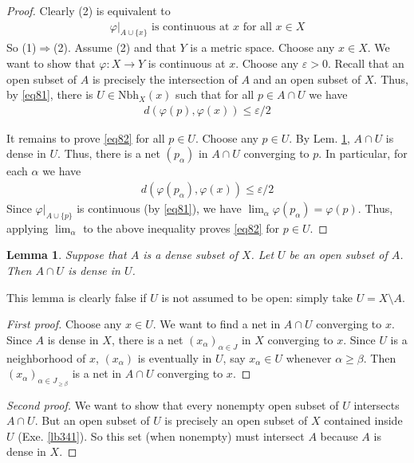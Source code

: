 \documentclass[12pt,b5paper,notitlepage]{article}
\theoremstyle{definition}
\theoremstyle{plain}
\newtheorem{lm}[df]{Lemma}
\newcommand{\Nbh}{\mathrm{Nbh}}
\newcommand{\eps}{\varepsilon}
\numberwithin{equation}{section}
\begin{document}
\begin{proof}
Clearly (2) is equivalent to
\begin{align}\label{eq81}
\varphi|_{A\cup\{x\}}\text{ is continuous at $x$ for all $x\in X$}
\end{align}
So (1)$\Rightarrow$(2). Assume (2) and that $Y$ is a metric space. Choose any $x\in X$. We want to show that $\varphi:X\rightarrow Y$ is continuous at $x$. Choose any $\eps>0$. Recall that an open subset of $A$ is precisely the intersection of $A$ and an open subset of $X$. Thus, by \eqref{eq81}, there is $U\in\Nbh_X(x)$ such that for all $p\in A\cap U$ we have
\begin{align}
d(\varphi(p),\varphi(x))\leq \eps/2\label{eq82}
\end{align}


It remains to prove \eqref{eq82} for all $p\in U$. Choose any $p\in U$. By Lem. \ref{lb342}, $A\cap U$ is dense in $U$.  Thus, there is a net $(p_\alpha)$ in $A\cap U$ converging to $p$. In particular, for each $\alpha$ we have
\begin{align*}
d(\varphi(p_\alpha),\varphi(x))\leq \eps/2
\end{align*}
Since $\varphi|_{A\cup\{p\}}$ is continuous (by \eqref{eq81}), we have $\lim_\alpha\varphi(p_\alpha)=\varphi(p)$. Thus, applying $\lim_\alpha$ to the above inequality proves \eqref{eq82} for $p\in U$.
\end{proof}


\begin{lm}\label{lb342}
Suppose that $A$ is a dense subset of $X$. Let $U$ be an open subset of $A$. Then $A\cap U$ is dense in $U$.
\end{lm}

This lemma is clearly false if $U$ is not assumed to be open: simply take $U=X\setminus A$.

\begin{proof}[First proof]
Choose any $x\in U$. We want to find a net in $A\cap U$ converging to $x$. Since $A$ is dense in $X$, there is a net $(x_\alpha)_{\alpha\in J}$ in $X$ converging to $x$. Since $U$ is a neighborhood of $x$, $(x_\alpha)$ is eventually in $U$, say $x_\alpha\in U$ whenever $\alpha\geq\beta$. Then $(x_\alpha)_{\alpha\in J_{\geq \beta}}$ is a net in $A\cap U$ converging to $x$.
\end{proof}

\begin{proof}[Second proof]
We want to show that every nonempty open subset of $U$ intersects $A\cap U$. But an open subset of $U$ is precisely an open subset of $X$ contained inside $U$ (Exe. \ref{lb341}). So this set (when nonempty) must intersect $A$ because $A$ is dense in $X$.
\end{proof}
\end{document}
